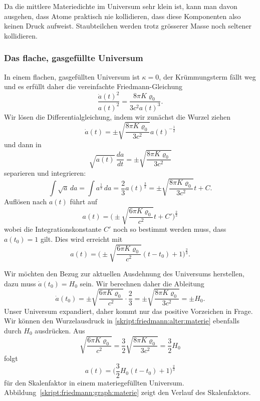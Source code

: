 Da die mittlere Materiedichte im Universum sehr klein ist, kann man davon
ausgehen, dass Atome praktisch nie kollidieren, dass diese Komponenten
also keinen Druck aufweist.
Staubteilchen werden trotz grösserer Masse noch seltener kollidieren.


\subsubsection{Das flache, gasgefüllte Universum}
In einem flachen, gasgefüllten Universum ist $\kappa=0$,
der Krümmungsterm fällt weg und
es erfüllt daher die vereinfachte Friedmann-Gleichung
\[
\frac{\dot a(t)^2}{a(t)^2}
=
\frac{8\pi K\varrho_0}{3c^2 a(t)^3}.
\]
Wir lösen die Differentialgleichung, indem wir zunächst die Wurzel ziehen 
\[
\dot a(t)=\pm \sqrt{
\frac{8\pi K\varrho_0}{3c^2}
}a(t)^{-\frac{1}{2}}
\]
und dann in
\[
\sqrt{a(t)}\,
\frac{da}{dt}
=
\pm\sqrt{\frac{8\pi K\varrho_0}{3c^2}}
\]
separieren und integrieren:
\[
\int \sqrt{a}\,da
=
\int a^\frac12\,da
=
\frac23 a(t)^\frac{3}{2}
=
\pm\sqrt{\frac{8\pi K\varrho_0}{3c^2}}t + C.
\]
Auflösen nach $a(t)$ führt auf
\[
a(t)=\biggl(\pm\sqrt{\frac{6\pi K\varrho_0}{c^2}}t+C'\biggr)^{\frac23}
\]
wobei die Integrationskonstante $C'$ noch so bestimmt werden muss,
dass $a(t_0)=1$ gilt.
Dies wird erreicht mit
\begin{equation}
a(t)
=
\biggl(\pm\sqrt{\frac{6\pi K\varrho_0}{c^2}}(t-t_0) + 1\biggr)^\frac23.
\label{skript:friedmann:alter:materie}
\end{equation}

Wir möchten den Bezug zur aktuellen Ausdehnung des Universums herstellen,
dazu muss $\dot a(t_0)=H_0$ sein.
Wir berechnen daher die Ableitung
\[
\dot a(t_0)=\pm \sqrt{\frac{6\pi K\varrho_0}{c^2}}\cdot \frac23
=
\pm \sqrt{\frac{8\pi K\varrho_0}{3c^2}}
=
\pm H_0.
\]
Unser Universum expandiert, daher kommt nur das positive Vorzeichen in Frage.
Wir können den Wurzelausdruck in \eqref{skript:friedmann:alter:materie} 
ebenfalls durch $H_0$ ausdrücken.
Aus
\[
\sqrt{\frac{6\pi K\varrho_0}{c^2}}
=
\frac32
\sqrt{\frac{8\pi K\varrho_0}{3c^2}}
=
\frac32H_0
\]
folgt
\begin{equation}
a(t) = \biggl(\frac32H_0(t-t_0)+1\biggr)^\frac23
\label{skript:friedmann:alter:materie2}
\end{equation}
für den Skalenfaktor in einem materiegefüllten Universum.
Abbildung~\ref{skript:friedmann:graph:materie} zeigt den Verlauf
des Skalenfaktors.

